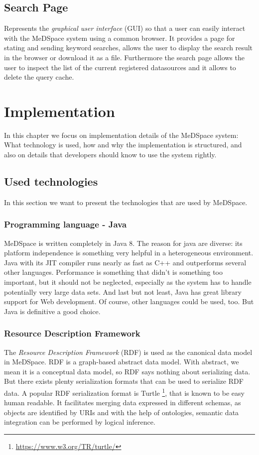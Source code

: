 \section{Search Page}
Represents the \emph{graphical user interface} (GUI) so that a user can easily interact with the MeDSpace system using a common browser. It provides a page for stating and sending keyword searches, allows the user to display the search result in the browser or download it as a file. Furthermore the search page allows the user to inspect the list of the current registered datasources and it allows to delete the query cache.

\chapter{Implementation}
In this chapter we focus on implementation details of the MeDSpace system: What technology is used, how and why the implementation is structured, and also on details that developers should know to use the system rightly.

\section{Used technologies}

In this section we want to present the technologies that are used by MeDSpace.

\subsection{Programming language - Java}
MeDSpace is written completely in Java 8. The reason for java are diverse: its platform independence is something very helpful in a heterogeneous environment. Java with its JIT compiler runs nearly as fast as C++ and outperforms several other languages. Performance is something that didn't is something too important, but it should not be neglected, especially as the system has to handle potentially very large data sets. And last but not least, Java has great library support for Web development. 
Of course, other languages could be used, too. But Java is definitive a good choice.

\subsection{Resource Description Framework}

The \emph{Resource Description Framework} (RDF) \cite{w3RDF} is used as the canonical data model in MeDSpace. RDF is a graph-based abstract data model. With abstract, we mean it is a conceptual data model, so RDF says nothing about serializing data. But there exists plenty serialization formats that can be used to serialize RDF data. A popular RDF serialization format is Turtle \footnote{\url{https://www.w3.org/TR/turtle/}}, that is known to be easy human readable.
It facilitates merging data expressed in different schemas, as objects are identified by URIs and with the help of ontologies, semantic data integration can be performed by logical inference. 

